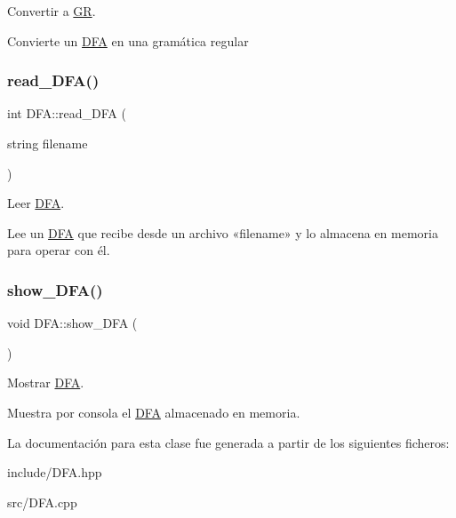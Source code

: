 Convertir a \mbox{\hyperlink{class_g_r}{GR}}. 

Convierte un \mbox{\hyperlink{class_d_f_a}{D\+FA}} en una gramática regular \mbox{\label{class_d_f_a_a835c3e271e3cfa828be10d92a7d8dca8}} 
\subsubsection{\texorpdfstring{read\+\_\+\+D\+F\+A()}{read\_DFA()}}
{\footnotesize\ttfamily int D\+F\+A\+::read\+\_\+\+D\+FA (\begin{DoxyParamCaption}\item[{string}]{filename }\end{DoxyParamCaption})}



Leer \mbox{\hyperlink{class_d_f_a}{D\+FA}}. 

Lee un \mbox{\hyperlink{class_d_f_a}{D\+FA}} que recibe desde un archivo «filename» y lo almacena en memoria para operar con él. \mbox{\label{class_d_f_a_a3523d9fd18d415c21e36d8269ab534dd}} 
\subsubsection{\texorpdfstring{show\+\_\+\+D\+F\+A()}{show\_DFA()}}
{\footnotesize\ttfamily void D\+F\+A\+::show\+\_\+\+D\+FA (\begin{DoxyParamCaption}{ }\end{DoxyParamCaption})}



Mostrar \mbox{\hyperlink{class_d_f_a}{D\+FA}}. 

Muestra por consola el \mbox{\hyperlink{class_d_f_a}{D\+FA}} almacenado en memoria. 

La documentación para esta clase fue generada a partir de los siguientes ficheros\+:\begin{DoxyCompactItemize}
\item 
include/D\+F\+A.\+hpp\item 
src/D\+F\+A.\+cpp\end{DoxyCompactItemize}
